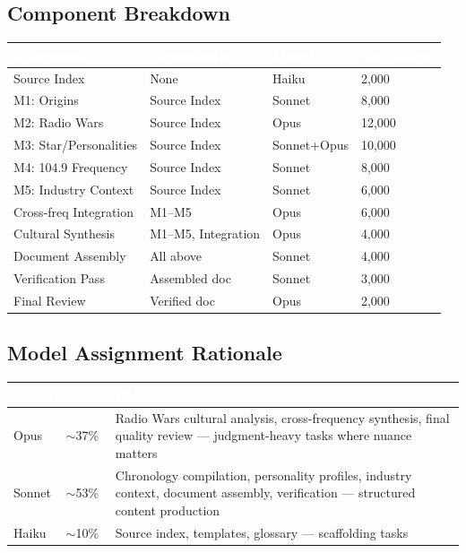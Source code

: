 \documentclass[11pt,letterpaper]{article}
\newcommand{\tableheader}[1]{\textbf{\sffamily\textcolor{white}{#1}}}
\begin{document}
\subsection{Component Breakdown}

\begin{center}
\begin{tabularx}{\textwidth}{L{3.5cm}L{2.5cm}C{1.5cm}C{2cm}}
\toprule
{}
\tableheader{Component} & \tableheader{Dependencies} & \tableheader{Model} & \tableheader{Est. Tokens} \\
\midrule
Source Index & None & Haiku & 2,000 \\
M1: Origins & Source Index & Sonnet & 8,000 \\
M2: Radio Wars & Source Index & Opus & 12,000 \\
M3: Star/Personalities & Source Index & Sonnet+Opus & 10,000 \\
M4: 104.9 Frequency & Source Index & Sonnet & 8,000 \\
M5: Industry Context & Source Index & Sonnet & 6,000 \\
Cross-freq Integration & M1--M5 & Opus & 6,000 \\
Cultural Synthesis & M1--M5, Integration & Opus & 4,000 \\
Document Assembly & All above & Sonnet & 4,000 \\
Verification Pass & Assembled doc & Sonnet & 3,000 \\
Final Review & Verified doc & Opus & 2,000 \\
\bottomrule
\end{tabularx}
\end{center}

\subsection{Model Assignment Rationale}

\begin{center}
\begin{tabularx}{\textwidth}{C{1.5cm}C{1.5cm}X}
\toprule
{}
\tableheader{Model} & \tableheader{Alloc.} & \tableheader{Rationale} \\
\midrule
Opus & $\sim$37\% & Radio Wars cultural analysis, cross-frequency synthesis, final quality review --- judgment-heavy tasks where nuance matters \\
Sonnet & $\sim$53\% & Chronology compilation, personality profiles, industry context, document assembly, verification --- structured content production \\
Haiku & $\sim$10\% & Source index, templates, glossary --- scaffolding tasks \\
\bottomrule
\end{tabularx}
\end{center}
\end{document}
